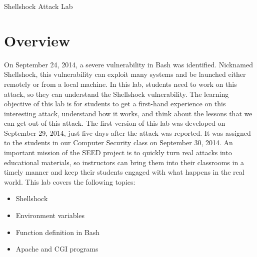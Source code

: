 
\newcommand{\commonfolder}{../../common-files}
\newcommand{\webcommon}{../Web_Common}





\newcommand{\bash}{{\tt bash}\xspace}
\newcommand{\Bash}{{\tt Bash}\xspace}




\begin{center}
{\LARGE Shellshock Attack Lab}
\end{center}


\section{Overview}

On September 24, 2014, a severe vulnerability in Bash was identified.
Nicknamed Shellshock, this vulnerability can exploit many systems and be
launched either remotely or from a local machine.  In this
lab, students need to work on this attack, so they can understand the
Shellshock vulnerability. The learning objective of this lab is for students to get a
first-hand experience on this interesting attack, understand how it
works, and think about the lessons that we can get out of this
attack. The first version of this lab was developed on September 29, 2014, 
just five days after the attack was reported. It was assigned to the students 
in our Computer Security class on September 30, 2014. An important mission
of the SEED project is to quickly turn real attacks 
into educational materials, so instructors can bring them into their
classrooms in a timely manner and keep their students engaged with what
happens in the real world. This lab covers the following topics:

\begin{itemize}[noitemsep]
\item Shellshock
\item Environment variables 
\item Function definition in Bash
\item Apache and CGI programs
\end{itemize}


